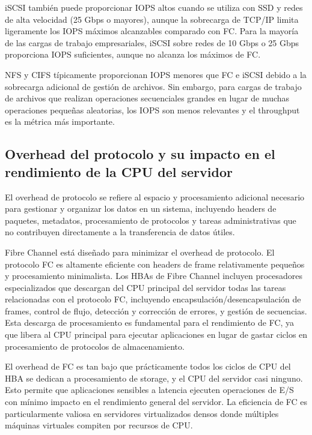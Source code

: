 iSCSI también puede proporcionar IOPS altos cuando se utiliza con SSD y redes de alta velocidad (25 Gbps o mayores), aunque la sobrecarga de TCP/IP limita ligeramente los IOPS máximos alcanzables comparado con FC. Para la mayoría de las cargas de trabajo empresariales, iSCSI sobre redes de 10 Gbps o 25 Gbps proporciona IOPS suficientes, aunque no alcanza los máximos de FC.

NFS y CIFS típicamente proporcionan IOPS menores que FC e iSCSI debido a la sobrecarga adicional de gestión de archivos. Sin embargo, para cargas de trabajo de archivos que realizan operaciones secuenciales grandes en lugar de muchas operaciones pequeñas aleatorias, los IOPS son menos relevantes y el throughput es la métrica más importante.

\subsection{Overhead del protocolo y su impacto en el rendimiento de la CPU del servidor}

El overhead de protocolo se refiere al espacio y procesamiento adicional necesario para gestionar y organizar los datos en un sistema, incluyendo headers de paquetes, metadatos, procesamiento de protocolos y tareas administrativas que no contribuyen directamente a la transferencia de datos útiles.

Fibre Channel está diseñado para minimizar el overhead de protocolo. El protocolo FC es altamente eficiente con headers de frame relativamente pequeños y procesamiento minimalista. Los HBAs de Fibre Channel incluyen procesadores especializados que descargan del CPU principal del servidor todas las tareas relacionadas con el protocolo FC, incluyendo encapsulación/desencapsulación de frames, control de flujo, detección y corrección de errores, y gestión de secuencias. Esta descarga de procesamiento es fundamental para el rendimiento de FC, ya que libera al CPU principal para ejecutar aplicaciones en lugar de gastar ciclos en procesamiento de protocolos de almacenamiento.

El overhead de FC es tan bajo que prácticamente todos los ciclos de CPU del HBA se dedican a procesamiento de storage, y el CPU del servidor casi ninguno. Esto permite que aplicaciones sensibles a latencia ejecuten operaciones de E/S con mínimo impacto en el rendimiento general del servidor. La eficiencia de FC es particularmente valiosa en servidores virtualizados densos donde múltiples máquinas virtuales compiten por recursos de CPU.



